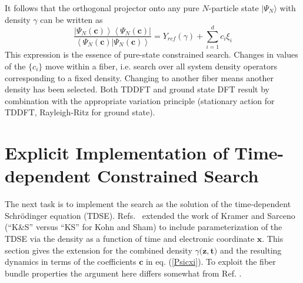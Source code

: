 \documentclass[aps,preprint]{revtex4}%
\begin{document}
It follows that the orthogonal projector onto any pure $N$-particle state
$|\Psi_{N}\rangle$ with density $\gamma$ can be written as
\begin{equation}
\frac{\left|  \Psi_{N}(\mathbf{c})\right\rangle \left\langle \Psi
_{N}(\mathbf{c})\right|  }{\left\langle \Psi_{N}(\mathbf{c})|\Psi
_{N}(\mathbf{c})\right\rangle }=Y_{ref}(\gamma)+\sum_{i=1}^{d}c_{i}\xi_{i}
\label{Psicxi}%
\end{equation}
This expression is the essence of pure-state constrained search. Changes in
values of the $\{c_{i}\}$ move within a fiber, i.e. search over all system
density operators corresponding to a fixed density. Changing to another fiber
means another density has been selected. Both TDDFT and ground state DFT
result by combination with the appropriate variation principle (stationary
action for TDDFT, Rayleigh-Ritz for ground state).

\section{Explicit Implementation of Time-dependent Constrained Search}

\noindent The next task is to implement the search as the solution of the
time-dependent Schr\"odinger equation (TDSE). Refs.~\cite{BLWSBT99a,BLWSBT00a}
extended the work of Kramer and Sarceno \cite{KramSar} (``K\&S'' versus ``KS''
for Kohn and Sham) to include parameterization of the TDSE via the density as
a function of time and electronic coordinate $\mathbf{x}$. This section gives
the extension for the combined density $\gamma(\mathbf{z, t)}$ and the
resulting dynamics in terms of the coefficients $\mathbf{c}$ in eq.
(\ref{Psicxi}). To exploit the fiber bundle properties the argument here
differs somewhat from Ref. \cite{BLWSBT99a}.
\end{document}
